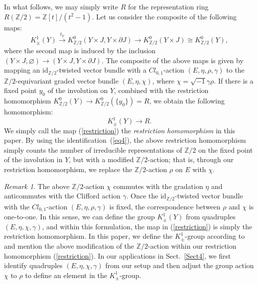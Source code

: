 \documentclass{amsart}
\theoremstyle{plain}
\theoremstyle{definition}
\theoremstyle{remark}
\newtheorem{remark}[theorem]{Remark}
\newcommand{\Z}{\mathbb{Z}}
\newcommand{\id}{\mathrm{id}}
\begin{document}
In what follows, we may simply write $R$ for the representation ring $R(\Z/2) = \Z[t]/(t^2-1)$.
Let us consider the composite of the following maps:
\begin{equation*}
	K^1_\pm(Y) \overset{t_Y}{\longrightarrow} K^0_{\Z/2}(Y \times J, Y \times \partial J)
		\to K^0_{\Z/2}(Y \times J) \cong K^0_{\Z/2}(Y),
\end{equation*}
where the second map is induced by the inclusion $(Y \times J, \varnothing) \to (Y \times J, Y \times \partial J)$.
The composite of the above maps is given by mapping an $\id_{\Z/2}$-twisted vector bundle with a $Cl_{0,1}$-action $(E, \eta, \rho, \gamma)$ to the $\Z/2$-equivariant graded vector bundle $(E, \eta, \chi)$, where $\chi = \sqrt{-1} \gamma \rho$.
If there is a fixed point $y_0$ of the involution on $Y$, combined with the restriction homomorphism
$K^0_{\Z/2}(Y) \to K^0_{\Z/2}(\{y_0\}) = R$,
we obtain the following homomorphism:
\begin{equation}
\label{restriction}
	K^1_\pm(Y) \to R.
\end{equation}
We simply call the map (\ref{restriction}) the {\em restriction homomorphism} in this paper.
By using the identification~(\ref{eq4}), the above restriction homomorphism simply counts the number of irreducible representations of $\Z/2$ on the fixed point of the involution in $Y$, but with a modified $\Z/2$-action; that is, through our restriction homomorphism, we replace the $\Z/2$-action $\rho$ on $E$ with $\chi$.

\begin{remark}
\label{action}
The above $\Z/2$-action $\chi$ commutes with the gradation $\eta$ and anticommutes with the Clifford action $\gamma$.
Once the $\id_{\Z/2}$-twisted vector bundle with the $Cl_{0,1}$-action $(E, \eta, \rho, \gamma)$ is fixed, the correspondence between $\rho$ and $\chi$ is one-to-one.
In this sense, we can define the group $K^1_\pm(Y)$ from quadruples $(E, \eta, \chi, \gamma)$, and within this formulation, the map in (\ref{restriction}) is simply the restriction homomorphism.
In this paper, we define the $K^1_\pm$-group according to \cite{Gomi15} and mention the above modification of the $\Z/2$-action within our restriction homomorphism (\ref{restriction}).
In our applications in Sect.~\ref{Sect4}, we first identify quadruples $(E, \eta, \chi, \gamma)$ from our setup and then adjust the group action $\chi$ to $\rho$ to define an element in the $K^1_\pm$-group.
\end{remark}
\end{document}
